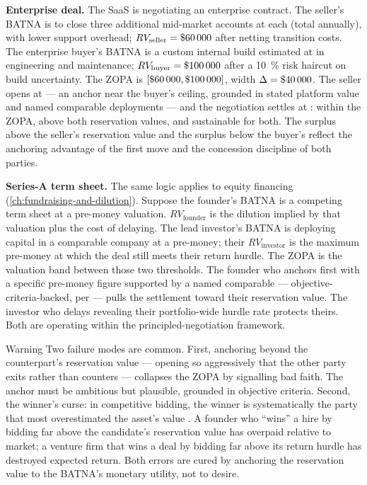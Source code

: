 \begin{example}
\textbf{Enterprise deal.} The SaaS is negotiating an enterprise contract. The seller's
BATNA is to close three additional mid-market accounts at  each (total
 annually), with lower support overhead; \(RV_{\text{seller}} = \$\num{60000}\)
after netting transition costs. The enterprise buyer's BATNA is a custom internal build
estimated at  in engineering and maintenance;
\(RV_{\text{buyer}} = \$\num{100000}\) after a \qty{10}{\percent} risk haircut on build
uncertainty. The ZOPA is \([\$\num{60000}, \$\num{100000}]\), width
\(\Delta = \$\num{40000}\). The seller opens at  --- an anchor near the
buyer's ceiling, grounded in stated platform value and named comparable deployments ---
and the negotiation settles at : within the ZOPA, above both reservation
values, and sustainable for both. The  surplus above the seller's reservation
value and the  surplus below the buyer's reflect the anchoring advantage of
the first move and the concession discipline of both parties.

\textbf{Series-A term sheet.} The same logic applies to equity financing
(\cref{ch:fundraising-and-dilution}). Suppose the founder's BATNA is a competing term
sheet at a  pre-money valuation. \(RV_{\text{founder}}\) is the dilution
implied by that valuation plus the cost of delaying. The lead investor's BATNA is
deploying capital in a comparable company at a  pre-money; their
\(RV_{\text{investor}}\) is the maximum pre-money at which the deal still meets their
return hurdle. The ZOPA is the valuation band between those two thresholds. The founder
who anchors first with a specific pre-money figure supported by a named comparable ---
objective-criteria-backed, per \textcite{raiffa1982art} --- pulls the settlement toward
their reservation value. The investor who delays revealing their portfolio-wide hurdle
rate protects theirs. Both are operating within the principled-negotiation framework.
\end{example}

\begin{admonition}{Warning}
Two failure modes are common. First, anchoring beyond the counterpart's reservation
value --- opening so aggressively that the other party exits rather than counters ---
collapses the ZOPA by signalling bad faith. The anchor must be ambitious but plausible,
grounded in objective criteria. Second, the winner's curse: in competitive bidding, the
winner is systematically the party that most overestimated the asset's value
\parencite{thaler1988winnerscurse}. A founder who ``wins'' a hire by bidding far above
the candidate's reservation value has overpaid relative to market; a venture firm that
wins a deal by bidding far above its return hurdle has destroyed expected return.
Both errors are cured by anchoring the reservation value to the BATNA's monetary utility,
not to desire.
\end{admonition}


